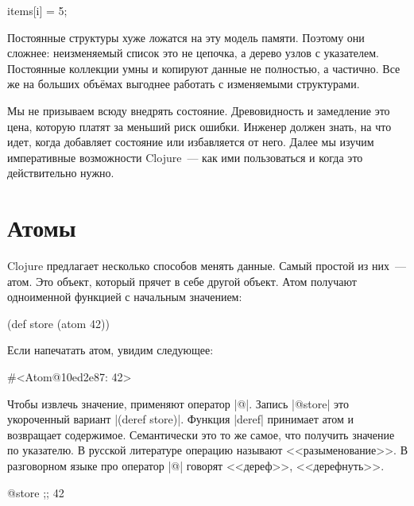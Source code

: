 \begin{english}
  \begin{python}
items[i] = 5;
  \end{python}
\end{english}

Постоянные структуры хуже ложатся на эту модель памяти. Поэтому они сложнее:
неизменяемый список это не цепочка, а дерево узлов с указателем. Постоянные
коллекции умны и копируют данные не полностью, а частично. Все же на больших
объ\"{е}мах выгоднее работать с изменяемыми структурами.

Мы не призываем всюду внедрять состояние. Древовидность и замедление это цена,
которую платят за меньший риск ошибки. Инженер должен знать, на что идет, когда
добавляет состояние или избавляется от него. Далее мы изучим императивные
возможности Clojure~--- как ими пользоваться и когда это действительно нужно.

\section{Атомы}

Clojure предлагает несколько способов менять данные. Самый простой из них~---
атом. Это объект, который прячет в себе другой объект. Атом получают одноименной
функцией с начальным значением:

\begin{english}
  \begin{clojure}
(def store (atom 42))
  \end{clojure}
\end{english}

\noindent
Если напечатать атом, увидим следующее:

\begin{english}
  \begin{clojure}
#<Atom@10ed2e87: 42>
  \end{clojure}
\end{english}

Чтобы извлечь значение, применяют оператор \spverb|@|. Запись \spverb|@store|
это укороченный вариант \spverb|(deref store)|. Функция \spverb|deref| принимает
атом и возвращает содержимое. Семантически это то же самое, что получить
значение по указателю. В русской литературе операцию называют
<<разыменование>>. В разговорном языке про оператор \spverb|@| говорят
<<дереф>>, <<дерефнуть>>.

\begin{english}
  \begin{clojure}
@store ;; 42
  \end{clojure}
\end{english}

